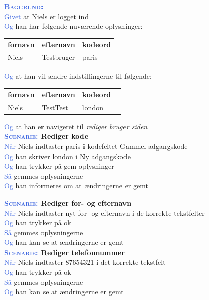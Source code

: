 \textsc{\textcolor{RoyalBlue}{\textbf{Baggrund:}}}\\
\textcolor{RoyalBlue}{Givet} at Niels er logget ind\\
\textcolor{RoyalBlue}{Og} han har følgende nuværende oplysninger:\\
\begin{tabular}{| l | l | l |}
	\textbf{fornavn} & \textbf{efternavn} & \textbf{kodeord} \\
	Niels & Testbruger & paris \\
\end{tabular}
\newline \newline
\textcolor{RoyalBlue}{Og} at han vil ændre indstillingerne til følgende:\\
\begin{tabular}{| l | l | l | l |}
	\textbf{fornavn} & \textbf{efternavn} & \textbf{kodeord} \\
	Niels & TestTest & london \\
\end{tabular}
\newline \newline
\textcolor{RoyalBlue}{Og} at han er navigeret til \emph{rediger bruger siden} \\

\textbf{\textsc{\textcolor{RoyalBlue}{Scenarie:}} Rediger kode}\\
\textcolor{RoyalBlue}{Når} Niels indtaster paris i kodefeltet Gammel adgangskode\\
\textcolor{RoyalBlue}{Og} han skriver london i Ny adgangskode\\
\textcolor{RoyalBlue}{Og} han trykker på gem oplysninger\\
\textcolor{RoyalBlue}{Så} gemmes oplysningerne\\
\textcolor{RoyalBlue}{Og} han informeres om at ændringerne er gemt

\textbf{\textsc{\textcolor{RoyalBlue}{Scenarie:}} Rediger for- og efternavn}\\
\textcolor{RoyalBlue}{Når} Niels indtaster nyt for- og efternavn i de korrekte tekstfelter\\
\textcolor{RoyalBlue}{Og} han trykker på ok\\
\textcolor{RoyalBlue}{Så} gemmes oplysningerne\\
\textcolor{RoyalBlue}{Og} han kan se at ændringerne er gemt \\

\textbf{\textsc{\textcolor{RoyalBlue}{Scenarie:}} Rediger telefonnummer}\\
\textcolor{RoyalBlue}{Når} Niels indtaster 87654321 i det korrekte tekstfelt\\
\textcolor{RoyalBlue}{Og} han trykker på ok\\
\textcolor{RoyalBlue}{Så} gemmes oplysningerne\\
\textcolor{RoyalBlue}{Og} han kan se at ændringerne er gemt \\

